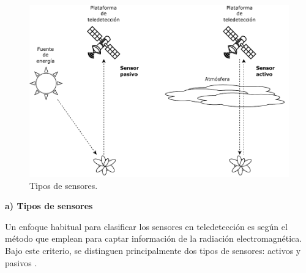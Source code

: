 \begin{figure}[H]
    \begin{center}
        \includegraphics[width=1\textwidth]{Images/TipoSensores.pdf}
    \end{center}
    \caption{Tipos de sensores.}
    \label{fig:TipoSensores}
\end{figure}

\textbf{a) Tipos de sensores}

Un enfoque habitual para clasificar los sensores en teledetección es según el método que emplean para captar información de la radiación electromagnética. Bajo este criterio, se distinguen principalmente dos tipos de sensores: activos y pasivos \cite{chuvieco2016fundamentals}.

